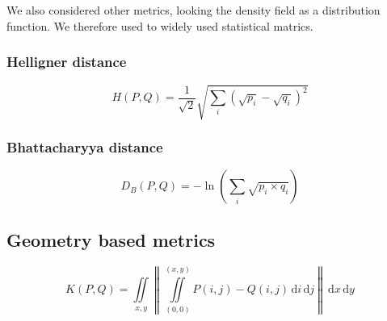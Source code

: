 \documentclass[10pt,a4paper,twoside,twocolumn]{article}
\newcommand*{\rootPath}{../}
\begin{document}
We also considered other metrics, looking the density field as a distribution
function. We therefore used to widely used statistical matrics.

\subsubsection{Helligner distance}
\begin{equation}
	H(P, Q) = \frac{1}{\sqrt{2}}\sqrt{\sum_i\left(\sqrt{p_i} - \sqrt{q_i}\right)^2}
\end{equation}

\subsubsection{Bhattacharyya distance}
\begin{equation}
	D_B(P, Q) = -\ln{\left(\sum_i \sqrt{p_i \times q_i}\right)}
\end{equation}






\subsection{Geometry based metrics}




\begin{equation}
	K(P, Q) = \iint\limits_{x,y}\left\|
							\iint\limits_{(0,0)}^{(x,y)} P(i,j)-Q(i,j)\,\mathrm{d}i\,\mathrm{d}j
						\right\|\,\mathrm{d}x\,\mathrm{d}y
\end{equation}







\ifstandalone
	
	
\fi
\end{document}
